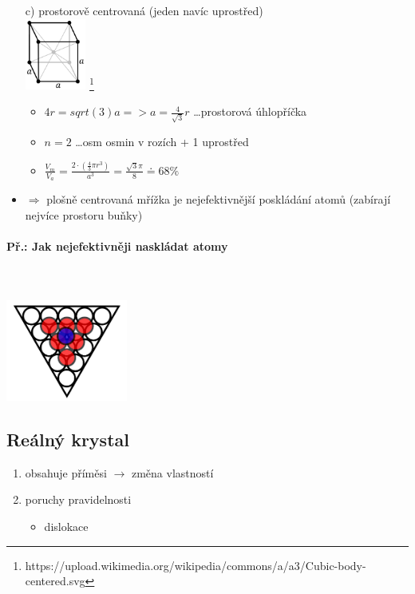 \begin{itemize}
\item[c)] prostorově centrovaná (jeden navíc uprostřed) \\
\includegraphics[width=2cm]{pictures/Cubic-body-centered.png} \footnote{https://upload.wikimedia.org/wikipedia/commons/a/a3/Cubic-body-centered.svg}
\begin{itemize}
\item $4r = sqrt(3)a => a = \frac{4}{\sqrt{3}}r$ \ldots prostorová úhlopříčka
\item $n = 2$ \ldots osm osmin v rozích + 1 uprostřed
\item $\frac{V_m}{V_a} = \frac{2 \cdot (\frac{4}{3}\pi r^3)}{a^3} = \frac{\sqrt{3}\pi}{8} \doteq  68\%$
\end{itemize}
\item $\Rightarrow$ plošně centrovaná mřížka je nejefektivnější poskládání atomů (zabírají nejvíce prostoru buňky)
\end{itemize}

\paragraph{Př.: Jak nejefektivněji naskládat atomy}\mbox{} \\ \mbox{} \\
\includegraphics[width=0.3\textwidth]{pictures/004.png}

\subsection{Reálný krystal}
\begin{enumerate}
\item obsahuje příměsi $\rightarrow$ změna vlastností
\item poruchy pravidelnosti
\begin{itemize}
\item dislokace
\end{itemize}
\end{enumerate}



